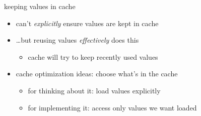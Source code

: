 \begin{frame}{keeping values in cache}
    \begin{itemize}
        \item can't \textit{explicitly} ensure values are kept in cache
        \item \ldots but reusing values \textit{effectively} does this
            \begin{itemize}
                \item cache will try to keep recently used values
            \end{itemize}
            \vspace{.5cm}
        \item cache optimization ideas: choose what's in the cache
            \begin{itemize}
            \item for thinking about it: load values explicitly
            \item for implementing it: access only values we want loaded
            \end{itemize}
    \end{itemize}
\end{frame}
